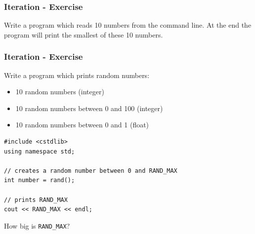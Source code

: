 \begin{frame}[fragile]
\frametitle{Iteration - Exercise}
\begin{exercise}
Write a program which reads 10 numbers from the command line. At the end the program
will print the smallest of these 10 numbers.\\
\end{exercise}
\end{frame}

\begin{frame}[fragile]
\frametitle{Iteration - Exercise}
\begin{exercise}
Write a program which prints random numbers:\\
\begin{itemize}
\item 10 random numbers (integer)
\item 10 random numbers between 0 and 100 (integer)
\item 10 random numbers between 0 and 1 (float)
\end{itemize}
{\tiny
\begin{lstlisting}
#include <cstdlib>
using namespace std;

// creates a random number between 0 and RAND_MAX
int number = rand();

// prints RAND_MAX
cout << RAND_MAX << endl;
\end{lstlisting}
}
How big is \verb|RAND_MAX|?
\end{exercise}
\end{frame}


